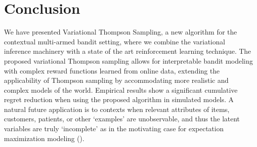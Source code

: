 \documentclass{article}
\begin{document}
%

\section{Conclusion}
\label{sec:conclusion}

We have presented Variational Thompson Sampling, a new algorithm for the contextual multi-armed bandit setting, where we combine the variational inference machinery with a state of the art reinforcement learning technique. The proposed variational Thompson sampling allows for interpretable bandit modeling with complex reward functions learned from online data, extending the applicability of Thompson sampling by accommodating more realistic and complex models of the world. Empirical results show a significant cumulative regret reduction when using the proposed algorithm in simulated models. A natural future application is to contexts when relevant attributes of items, customers, patients, or other `examples' are unobservable, and thus the latent variables are truly `incomplete' as in the motivating case for expectation maximization modeling (\cite{j-Dempster1977}).






\end{document}

